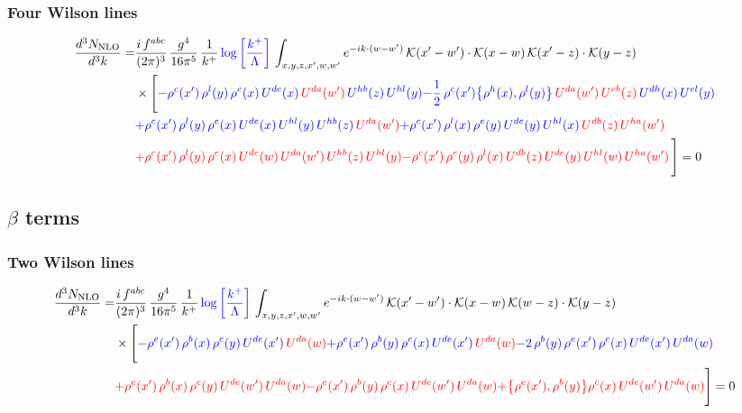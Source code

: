 \documentclass[9pt]{article}
\numberwithin{equation}{section}
\begin{document}
\subsubsection{Four Wilson lines}
\begin{align}
    \frac{d^{3}N_{\rm NLO}}{d^{3}k}= & \frac{i\,f^{abc}}{(2\pi)^{3}}\,\frac{g^{4}}{16\pi^{5}}\,\frac{1}{k^{+}}\,{\color{blue}\log{\left[\frac{k^{+}}{\Lambda}\right]}}\,\int_{x,y,z,x',w,w'}e^{-ik\cdot (w-w')}\,\mathcal{K}(x'-w')\cdot\mathcal{K}(x-w)\,\mathcal{K}(x'-z)\cdot\mathcal{K}(y-z)\notag \\ & \times\Bigg[{\color{blue}-\rho^{c}(x')\,\rho^{l}(y)\,\rho^{e}(x)\,U^{de}(x)\,{\color{red}U^{da}(w')}\,U^{hb}(z)\,U^{hl}(y)}{\color{blue}-\frac{1}{2}\,\rho^{c}(x')\big\{\rho^{h}(x),\rho^{l}(y)\big\}\,{\color{red}U^{da}(w')}\,{\color{red}U^{eb}(z)}\,U^{dh}(x)\,U^{el}(y)}\notag \\ & {\color{blue}+\rho^{c}(x')\,\rho^{l}(y)\,\rho^{e}(x)\,U^{de}(x)\,U^{hl}(y)\,U^{hb}(z)\,{\color{red}U^{da}(w')}}{\color{blue}+\rho^{c}(x')\,\rho^{l}(x)\,\rho^{e}(y)\,U^{de}(y)\,U^{hl}(x)\,{\color{red}U^{db}(z)}\,{\color{red}U^{ha}(w')}}\notag \\ &{\color{red}+\rho^{c}(x')\,\rho^{l}(y)\,\rho^{e}(x)\,U^{de}(w)\,{\color{red}U^{da}(w')}\,U^{hb}(z)\,U^{hl}(y)}{\color{red}-\rho^{c}(x')\,\rho^{e}(y)\,\rho^{l}(x)\,{\color{red}U^{db}(z)}\,U^{de}(y)\,U^{hl}(w)\,U^{ha}(w')}\,\Bigg] = 0
\end{align}
\subsection{$\beta$ terms}
\subsubsection{Two Wilson lines}
\begin{align}
    \frac{d^{3}N_{\rm NLO}}{d^{3}k}= & \frac{i\,f^{abc}}{(2\pi)^{3}}\,\frac{g^{4}}{16\pi^{5}}\,\frac{1}{k^{+}}\,{\color{blue}\log{\left[\frac{k^{+}}{\Lambda}\right]}}\,\int_{x,y,z,x',w,w'}e^{-ik\cdot (w-w')}\,\mathcal{K}(x'-w')\cdot\mathcal{K}(x-w)\,\mathcal{K}(w-z)\cdot\mathcal{K}(y-z)\notag \\ & \times\Bigg[{\color{blue}-\rho^{e}(x')\,\rho^{b}(x)\,\rho^{c}(y)\,U^{de}(x')\,{\color{red}U^{da}(w)}}{\color{blue}+\rho^{e}(x')\,\rho^{b}(y)\,\rho^{c}(x)\,U^{de}(x')\,{\color{red}U^{da}(w)}}{\color{blue}-2\,\rho^{b}(y)\,\rho^{e}(x')\, \rho^{c}(x)\, U^{de}(x')\,U^{da}(w)}\notag \\ & {\color{red}+\rho^{e}(x')\,\rho^{b}(x)\,\rho^{c}(y)\,U^{de}(w')\,{\color{red}U^{da}(w)}}{\color{red}-\rho^{e}(x')\,\rho^{b}(y)\,\rho^{c}(x)\,U^{de}(w')\,{\color{red}U^{da}(w)}}{\color{red}+\big\{\rho^{e}(x'),\rho^{b}(y)\big\}\rho^{c}(x)\,U^{de}(w')\,{\color{red}U^{da}(w)}}\Bigg] = 0
\end{align}   
\end{document}

